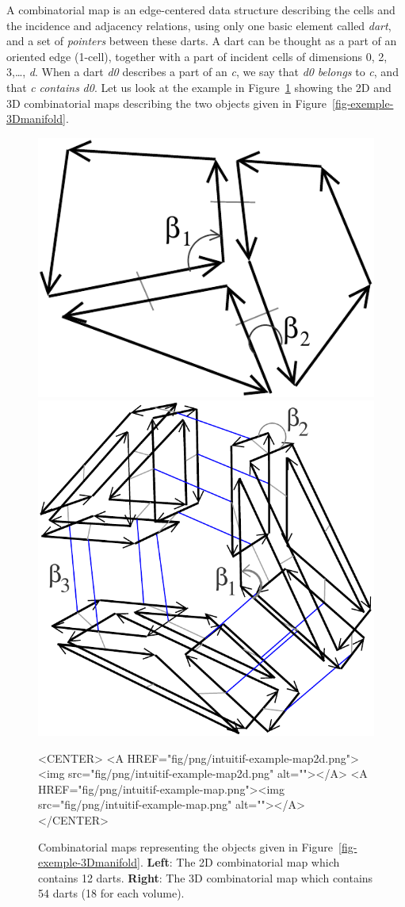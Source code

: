 A combinatorial map is an edge-centered data structure describing the
cells and the incidence and adjacency relations, using only one basic
element called \emph{dart}, and a set of \emph{pointers} between these
darts.  A dart can be thought as a part of an oriented edge (1-cell),
together with a part of incident cells of dimensions 0, 2, 3,\ldots,
\emph{d}. When a dart \emph{d0} describes a part of an  \emph{c}, we say that
\emph{d0} \emph{belongs} to \emph{c}, and that \emph{c} \emph{contains} \emph{d0}.  Let
us look at the example in Figure~\ref{fig-exemple-combi-maps} showing
the 2D and 3D combinatorial maps describing the two objects given in
Figure~\ref{fig-exemple-3Dmanifold}.
\begin{figure}[ht]
  \begin{ccTexOnly}
    \begin{center}
      \includegraphics[width=.3\textwidth]
      {Combinatorial_map/fig/pdf/intuitif-example-map2d}
      \qquad
      \includegraphics[width=.4\textwidth]
      {Combinatorial_map/fig/pdf/intuitif-example-map}
    \end{center}
  \end{ccTexOnly}
  \begin{ccHtmlOnly}
    <CENTER>
    <A HREF="fig/png/intuitif-example-map2d.png"><img src="fig/png/intuitif-example-map2d.png" alt=""></A>
    <A HREF="fig/png/intuitif-example-map.png"><img src="fig/png/intuitif-example-map.png" alt=""></A>
    </CENTER>
    \end{ccHtmlOnly}
    \caption{Combinatorial maps representing the objects given in 
      Figure~\ref{fig-exemple-3Dmanifold}.
      \textbf{Left}: The 2D combinatorial map which contains 12 darts.
      \textbf{Right}: The 3D combinatorial map which contains 54 darts
      (18 for each volume).
    }
    \label{fig-exemple-combi-maps}
\end{figure}

